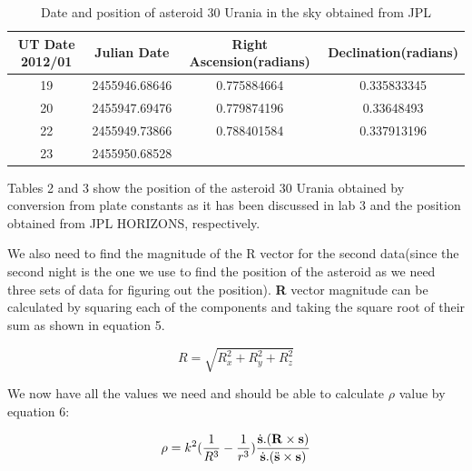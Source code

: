 \documentclass[letterpaper,12pt]{article}
\begin{document}
\FloatBarrier
\begin{table}[h!]
\caption{Date and position of asteroid 30 Urania in the sky obtained from JPL} %
\centering %
\begin{tabular}{| c | c | c | c |} %
\hline %
UT Date 2012/01 & Julian Date & Right Ascension(radians) & Declination(radians) \\ [0.5ex] %
\hline %
19   &   2455946.68646  & 0.775884664&   0.335833345 \\ \hline
20   &   2455947.69476  & 0.779874196  & 0.33648493   \\ \hline
22   &   2455949.73866 &  0.788401584 & 0.337913196    \\  \hline
23   &   2455950.68528  &  &     \\ [1ex] %
\hline %
\end{tabular}
\label{table:nonlin} %
\end{table}
\FloatBarrier

Tables 2 and 3 show the position of the asteroid 30 Urania obtained by conversion from plate constants as it has been discussed in lab 3 and the position obtained from JPL HORIZONS, respectively.

We also need to find the magnitude of the R vector for the second data(since the second night is the one we use to find the position of the asteroid as we need three sets of data for figuring out the position). {\bf R} vector magnitude can be calculated by squaring each of the components and taking the square root of their sum as shown in equation 5.

\begin{equation}
R=\sqrt{R_{x}^2+R_{y}^2+R_{z}^2}
\end{equation}


We now have all the values we need and should be able to calculate \begin{math} \rho \end{math} value by equation 6:

\begin{equation}
\rho=k^2(\frac{1}{R^3}-\frac{1}{r^3})\frac{\dot{{\bf s}}.({\bf R}\times{\bf s})}{\dot{{\bf s}}.(\ddot{{\bf s}}\times{\bf s})}
\end{equation}
\end{document}
